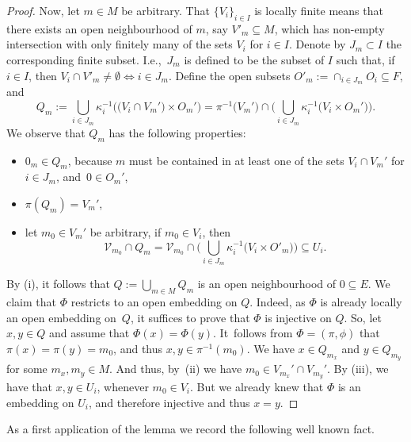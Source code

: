 \documentclass[11pt]{article}
\numberwithin{equation}{section}
\numberwithin{equation}{section}
\begin{document}
\begin{proof}
Now, let $m \in M$ be arbitrary.
That $\{V_i\}_{i\in I}$ is locally finite means that there exists an open neighbourhood of $m$, say $V'_{m} \subseteq M$, which has non-empty intersection with only finitely many of the sets $V_{i}$ for $i \in I$.
Denote by $J_{m}\subset I$ the corresponding finite subset.
I.e.,~$J_{m}$ is defined to be the subset of $I$ such that, if $i \in I$, then
$V_{i} \cap V'_{m} \neq \emptyset \Longleftrightarrow i \in J_{m}.$
Define the open subsets
$
 O'_{m} := \cap_{i \in J_{m}} O_{i} \subseteq F,
 $ and
\begin{equation*}
 Q_{m} := \bigcup_{i \in J_{m}} \kappa_{i}^{-1}\bigl(\bigl(V_{i}\cap V_{m}'\bigr) \times O_{m}'\bigr) = \pi^{-1}\bigl(V_{m}'\bigr) \cap \biggl(\bigcup_{i \in J_{m}} \kappa_{i}^{-1}\bigl(V_{i} \times O_{m}'\bigr)\biggr).
\end{equation*}
We observe that $Q_{m}$ has the following properties:
\begin{itemize}\itemsep=0pt
 \item[(i)] $0_{m} \in Q_{m}$, because $m$ must be contained in at least one of the sets $V_{i} \cap V_{m}'$ for $i \in J_{m}$, and~$0 \in O_{m}'$,
 \item[(ii)] $\pi(Q_{m}) = V_{m}'$,
 \item[(iii)] let $m_{0} \in V_{m}'$ be arbitrary, if $m_{0} \in V_{i}$, then
 \begin{equation*}
 \mathcal{V}_{m_{0}} \cap Q_{m} = \mathcal{V}_{m_{0}} \cap \biggl( \bigcup_{i \in J_{m}} \kappa_{i}^{-1}\bigl(V_{i} \times O'_{m}\bigr)\biggr) \subseteq U_{i}.
 \end{equation*}
\end{itemize}
By (i), it follows that
$
 Q := \bigcup_{m \in M} Q_{m}
$ is an open neighbourhood of $0 \subseteq E$.
We claim that $\Phi$ restricts to an open embedding on $Q$.
Indeed, as $\Phi$ is already locally an open embedding on~$Q$, it suffices to prove that $\Phi$ is injective on $Q$.
So, let $x,y \in Q$ and assume that $\Phi(x) = \Phi(y)$.
It~follows from $\Phi=(\pi,\phi)$ that $\pi(x) = \pi(y) = m_{0}$, and thus $x,y \in \pi^{-1}(m_{0})$.
We have $x \in Q_{m_{x}}$ and $y \in Q_{m_{y}}$ for some $m_{x},m_{y} \in M$.
And thus, by~(ii) we have $m_{0} \in V_{m_{x}}' \cap V_{m_{y}}'$.
By (iii), we have that $x,y \in U_{i}$, whenever $m_{0} \in V_{i}$.
But we already knew that $\Phi$ is an embedding on $U_i$, and therefore injective and thus $x=y$.
\end{proof}

As a first application of the lemma we record the following well known fact.
\end{document}
